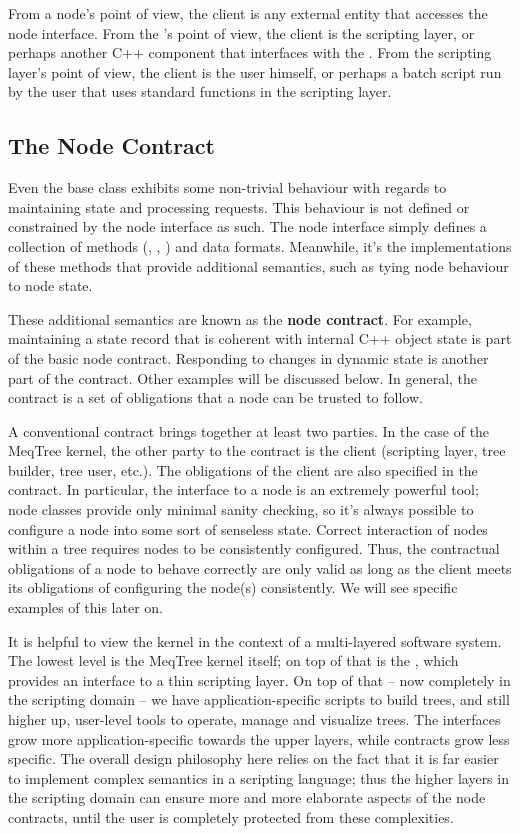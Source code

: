   From a node's point of view, the client is any external entity that accesses
  the node interface. From the 's point of view, the client is the
  scripting layer, or perhaps another C++ component that interfaces with the
  . From the scripting layer's point of view, the client is the
  user himself, or perhaps a batch script run by the user that uses standard
  functions in the scripting layer.

\subsection{The Node Contract}

  Even the base  class exhibits some non-trivial behaviour with
  regards to maintaining state and processing requests. This behaviour is not
  defined or constrained by the node interface as such. The node interface
  simply defines a collection of methods (, ,
  ) and data formats. Meanwhile, it's the implementations of
  these methods that provide additional semantics, such as tying node behaviour
  to node state.

  These additional semantics are known as the {\bf node contract}. For example,
  maintaining a state record that is coherent with internal C++ object state is
  part of the basic node contract. Responding to changes in dynamic state is
  another part of the contract. Other examples will be discussed below. In
  general, the contract is a set of obligations that a node can be trusted to
  follow.
  
  A conventional contract brings together at least two parties. In the case of
  the MeqTree kernel, the other party to the contract is the client  (scripting
  layer, tree builder, tree user, etc.). The obligations of the client are also
  specified in the contract. In particular, the  interface to a
  node is an extremely powerful tool; node classes provide only minimal sanity
  checking, so it's always possible to configure a node into some sort of
  senseless state. Correct interaction of nodes within a tree requires nodes to
  be consistently configured. Thus, the contractual obligations of a node to
  behave correctly are only valid as long as the client meets its obligations
  of configuring the node(s) consistently. We will see specific examples of
  this later on.
  
  It is helpful to view the kernel in the context of a multi-layered software
  system. The lowest level is the MeqTree kernel itself; on top of that is the
  , which provides an interface to a thin scripting layer. On top
  of that -- now completely in the scripting domain -- we have
  application-specific scripts to build trees, and still higher up, user-level
  tools to operate, manage and visualize trees. The interfaces grow more
  application-specific towards the upper layers, while contracts grow less
  specific. The overall design philosophy here relies on the fact that it is
  far easier to implement complex semantics in a scripting language; thus the
  higher layers in the scripting domain can ensure more and more elaborate
  aspects of the node contracts, until the user is completely protected from
  these complexities. 
  
